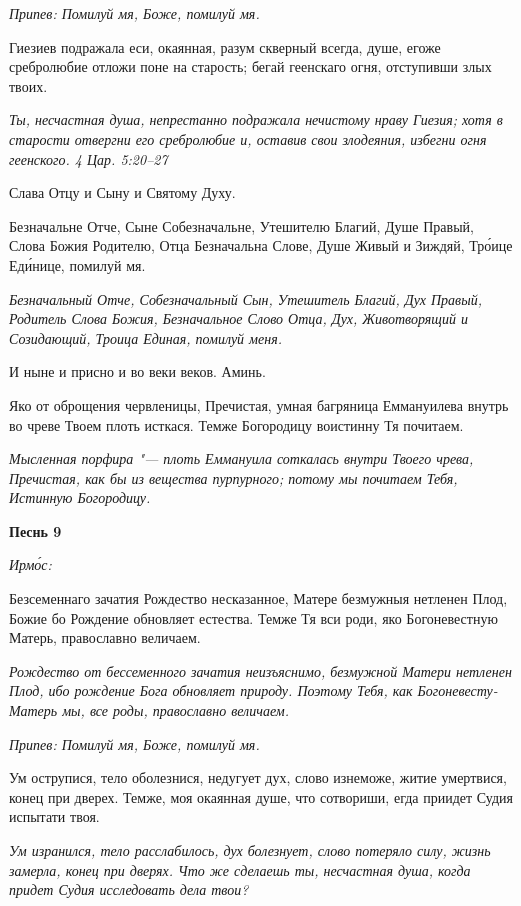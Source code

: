 \itshape Припев:\normalfont{} Помилуй мя, Боже, помилуй мя.


Гиезиев подражала еси, окаянная, разум скверный всегда, душе, егоже сребролюбие отложи поне на старость; бегай геенскаго огня, отступивши злых твоих.


\itshape Ты, несчастная душа, непрестанно подражала нечистому нраву Гиезия; хотя в старости отвергни его сребролюбие и, оставив свои злодеяния, избегни огня геенского. 4 Цар. 5:20–27\normalfont{}


Слава Отцу и Сыну и Святому Духу.


Безначальне Отче, Сыне Собезначальне, Утешителю Благий, Душе Правый, Слова Божия Родителю, Отца Безначальна Слове, Душе Живый и Зиждяй, Тро́ице Еди́нице, помилуй мя.


\itshape Безначальный Отче, Собезначальный Сын, Утешитель Благий, Дух Правый, Родитель Слова Божия, Безначальное Слово Отца, Дух, Животворящий и Созидающий, Троица Единая, помилуй меня.\normalfont{}


И ныне и присно и во веки веков. Аминь.


Яко от оброщения червленицы, Пречистая, умная багряница Еммануилева внутрь во чреве Твоем плоть исткася. Темже Богородицу воистинну Тя почитаем.


\itshape Мысленная порфира "--- плоть Еммануила соткалась внутри Твоего чрева, Пречистая, как бы из вещества пурпурного; потому мы почитаем Тебя, Истинную Богородицу.\normalfont{}





\bfseries Песнь 9\normalfont{}


\itshape Ирмо́с:\normalfont{}


Безсеменнаго зачатия Рождество несказанное, Матере безмужныя нетленен Плод, Божие бо Рождение обновляет естества. Темже Тя вси роди, яко Богоневестную Матерь, православно величаем.


\itshape Рождество от бессеменного зачатия неизъяснимо, безмужной Матери нетленен Плод, ибо рождение Бога обновляет природу. Поэтому Тебя, как Богоневесту-Матерь мы, все роды, православно величаем.\normalfont{}


\itshape Припев:\normalfont{} Помилуй мя, Боже, помилуй мя.


Ум острупися, тело оболезнися, недугует дух, слово изнеможе, житие умертвися, конец при дверех. Темже, моя окаянная душе, что сотвориши, егда приидет Судия испытати твоя.


\itshape Ум изранился, тело расслабилось, дух болезнует, слово потеряло силу, жизнь замерла, конец при дверях. Что же сделаешь ты, несчастная душа, когда придет Судия исследовать дела твои?\normalfont{}


